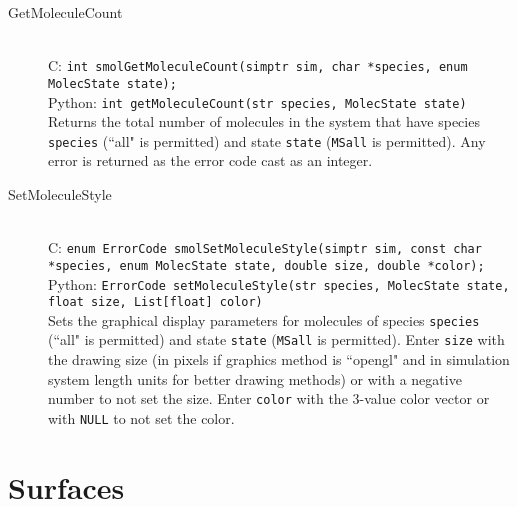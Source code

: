 \documentclass {book}
\begin{document}
\begin{description}
\item[GetMoleculeCount]
\hfill \\
C: \texttt{int smolGetMoleculeCount(simptr sim, char *species, enum MolecState state);}\\
Python: \texttt{int getMoleculeCount(str species, MolecState state)}\\
Returns the total number of molecules in the system that have species \texttt{species} (``all" is permitted) and state \texttt{state} (\texttt{MSall} is permitted). Any error is returned as the error code cast as an integer.

\item[SetMoleculeStyle]
\hfill \\
C: \texttt{enum ErrorCode smolSetMoleculeStyle(simptr sim, const char *species, enum MolecState state, double size, double *color);}\\
Python: \texttt{ErrorCode setMoleculeStyle(str species, MolecState state, float size, List[float] color)}\\
Sets the graphical display parameters for molecules of species \texttt{species} (``all" is permitted) and state \texttt{state} (\texttt{MSall} is permitted). Enter \texttt{size} with the drawing size (in pixels if graphics method is ``opengl" and in simulation system length units for better drawing methods) or with a negative number to not set the size. Enter \texttt{color} with the 3-value color vector or with \texttt{NULL} to not set the color.

\end{description}

\section{Surfaces}
\end{document}
